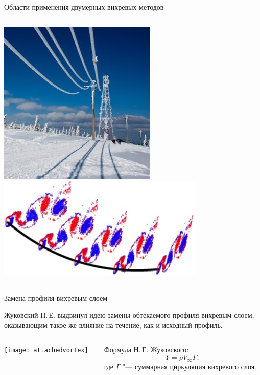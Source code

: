 \documentclass[ignoreonframetext,unicode]{beamer}
\begin{document}
\begin{frame}{Области применения двумерных вихревых методов}
\begin{columns}
\begin{columns}
				\includegraphics[width=\textwidth]{ris5}
				\includegraphics[width=\textwidth]{ris6}
			\end{columns}
		\end{columns}
	\end{frame}	
	

\begin{frame}{Замена профиля вихревым слоем}
	\begin{block}{}
		Жуковский Н.\,Е. выдвинул идею замены обтекаемого профиля вихревым слоем, оказывающим такое же влияние на течение, как и исходный профиль.
	\end{block}\medskip
	\begin{columns}
		\begin{column}{0.5\textwidth}
			\texttt{[image: attachedvortex]}
		\end{column}
		\begin{column}{0.5\textwidth}
			Формула Н.\,Е. Жуковского:
			\[
				Y=\rho V_{\infty}\Gamma,
			\]
			где $\Gamma$ "--- суммарная циркуляция вихревого слоя.
		\end{column}		
	\end{columns}	
\end{frame}	
\end{document}
